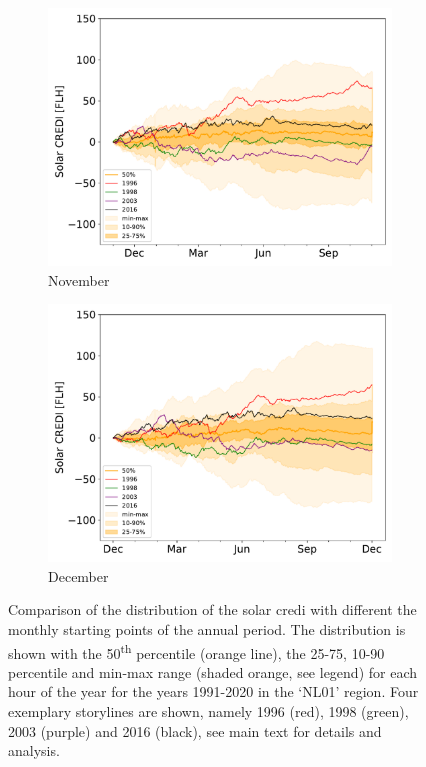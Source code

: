 \documentclass[12pt]{iopart}
\newcommand{\ts}[1]{\textsuperscript{#1}}
\newcommand{\sdi}[0]{{\sc solar credi}}
\begin{document}
\begin{figure}[t]
\begin{subfigure}[t]{0.32\linewidth}
    \includegraphics[width=\linewidth]{Figures_SI/Fig_CUMSUM_YearStart_SPV_November}
    \caption{November}
\end{subfigure}
\begin{subfigure}[t]{0.32\linewidth}
    \includegraphics[width=\linewidth]{Figures_SI/Fig_CUMSUM_YearStart_SPV_December}
    \caption{December }
\end{subfigure}
\caption{
    Comparison of the distribution of the \sdi{} with different the monthly starting points of the annual period. 
    The distribution is shown with the 50\ts{th} percentile (orange line), the 25-75, 10-90 percentile and min-max range (shaded orange, see legend) for each hour of the year for the years 1991-2020 in the `NL01' region. 
    Four exemplary storylines are shown, namely 1996 (red), 1998 (green), 2003 (purple) and 2016 (black), see main text for details and analysis.}
\label{SIfig:startdate_solar}
\end{figure}
\end{document}
